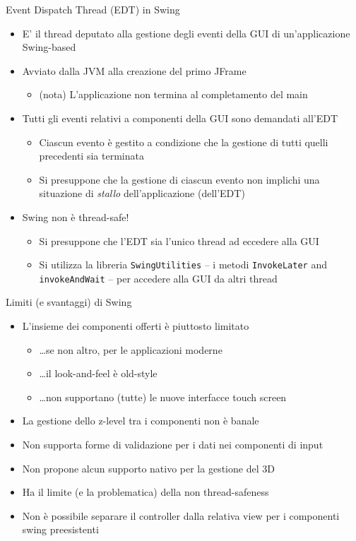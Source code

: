 \documentclass[presentation]{beamer}
\begin{document}
\begin{frame}{Event Dispatch Thread (EDT) in Swing}
\begin{itemize}\itemsep10pt
\item E' il thread deputato alla gestione degli eventi della GUI di un'applicazione Swing-based
\item Avviato dalla JVM alla creazione del primo JFrame
\begin{itemize}
\item (nota) L'applicazione non termina al completamento del main
\end{itemize}
\item Tutti gli eventi relativi a componenti della GUI sono demandati all'EDT
\begin{itemize}
\item Ciascun evento è gestito a condizione che la gestione di tutti quelli precedenti sia terminata
\item Si presuppone che la gestione di ciascun evento non implichi una situazione di \emph{stallo} dell'applicazione (dell'EDT)
\end{itemize}
\item Swing non è thread-safe!
\begin{itemize}
\item Si presuppone che l'EDT sia l'unico thread ad eccedere alla GUI
\item Si utilizza la libreria \texttt{SwingUtilities} -- i metodi \texttt{InvokeLater} and \texttt{invokeAndWait} -- per accedere alla GUI da altri thread
\end{itemize}
\end{itemize}
\end{frame}

\begin{frame}{Limiti (e svantaggi) di Swing}
\begin{itemize}\itemsep10pt
\item L'insieme dei componenti offerti è piuttosto limitato
\begin{itemize}
\item \dots se non altro, per le applicazioni moderne
\item \dots il look-and-feel è old-style
\item \dots non supportano (tutte) le nuove interfacce touch screen
\end{itemize}
\item La gestione dello z-level tra i componenti non è banale
\item Non supporta forme di validazione per i dati nei componenti di input
\item Non propone alcun supporto nativo per la gestione del 3D
\item Ha il limite (e la problematica) della non thread-safeness
\item Non è possibile separare il controller dalla relativa view per i componenti swing preesistenti
\end{itemize}
\end{frame}
\end{document}
